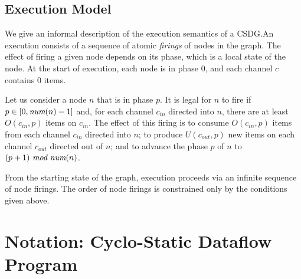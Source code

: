 \subsection{Execution Model}

We give an informal description of the execution semantics of a
CSDG.An execution consists of a sequence of atomic {\it firings} of
nodes in the graph.  The effect of firing a given node depends on its
phase, which is a local state of the node.  At the start of execution,
each node is in phase 0, and each channel $c$ contains 0 items.

Let us consider a node $n$ that is in phase $p$.  It is legal for $n$
to fire if $p \in [0, \mbox{\it num}(n)-1]$ and, for each channel $c_{in}$
directed into $n$, there are at least $O(c_{in}, p)$ items on
$c_{in}$.  The effect of this firing is to consume $O(c_{in}, p)$
items from each channel $c_{in}$ directed into $n$; to produce
$U(c_{out}, p)$ new items on each channel $c_{out}$ directed out of
$n$; and to advance the phase $p$ of $n$ to $(p +
1)~\mbox{\it mod}~\mbox{\it num}(n)$.

From the starting state of the graph, execution proceeds via an
infinite sequence of node firings.  The order of node firings is
constrained only by the conditions given above.

\section{Notation: Cyclo-Static Dataflow Program}

